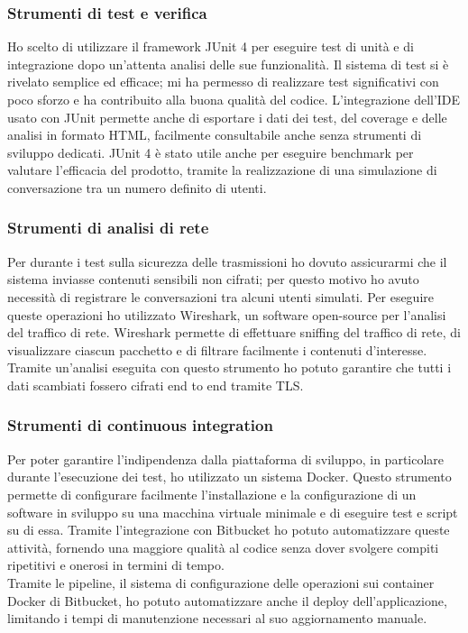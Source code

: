 		\subsubsection{Strumenti di test e verifica}
		Ho scelto di utilizzare il framework JUnit 4 per eseguire test di unità e di integrazione dopo un'attenta analisi delle sue funzionalità. Il sistema di test si è rivelato semplice ed efficace; mi ha permesso di realizzare test significativi con poco sforzo e ha contribuito alla buona qualità del codice. L'integrazione dell'IDE usato con JUnit permette anche di esportare i dati dei test, del coverage e delle analisi in formato HTML, facilmente consultabile anche senza strumenti di sviluppo dedicati. JUnit 4 è stato utile anche per eseguire benchmark per valutare l'efficacia del prodotto, tramite la realizzazione di una simulazione di conversazione tra un numero definito di utenti.
		
		\subsubsection{Strumenti di analisi di rete}
		Per durante i test sulla sicurezza delle trasmissioni ho dovuto assicurarmi che il sistema inviasse contenuti sensibili non cifrati; per questo motivo ho avuto necessità di registrare le conversazioni tra alcuni utenti simulati. Per eseguire queste operazioni ho utilizzato Wireshark, un software open-source per l'analisi del traffico di rete. Wireshark permette di effettuare sniffing del traffico di rete, di visualizzare ciascun pacchetto e di filtrare facilmente i contenuti d'interesse. Tramite un'analisi eseguita con questo strumento ho potuto garantire che tutti i dati scambiati fossero cifrati end to end tramite TLS.\@
		
		\subsubsection{Strumenti di continuous integration}
		Per poter garantire l'indipendenza dalla piattaforma di sviluppo, in particolare durante l'esecuzione dei test, ho utilizzato un sistema \gls{Docker}. Questo strumento permette di configurare facilmente l'installazione e la configurazione di un software in sviluppo su una macchina virtuale minimale e di eseguire test e script su di essa. Tramite l'integrazione con Bitbucket ho potuto automatizzare queste attività, fornendo una maggiore qualità al codice senza dover svolgere compiti ripetitivi e onerosi in termini di tempo.
		\\
		Tramite le pipeline, il sistema di configurazione delle operazioni sui container \gls{Docker} di Bitbucket, ho potuto automatizzare anche il deploy dell'applicazione, limitando i tempi di manutenzione necessari al suo aggiornamento manuale.

